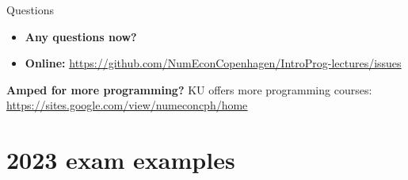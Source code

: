 \documentclass[10pt,english,t,aspectratio=169]{beamer}
\begin{document}
\begin{frame}{Questions}
\begin{itemize}
\item \textbf{Any questions now?}
\item \textbf{Online: }\href{https://github.com/NumEconCopenhagen/IntroProg-lectures/issues}{https://github.com/NumEconCopenhagen/IntroProg-lectures/issues}
\end{itemize}

\vfill
\textbf{Amped for more programming?} KU offers more programming courses: \underline{\href{https://sites.google.com/view/numeconcph/home}{https://sites.google.com/view/numeconcph/home}}
\end{frame}
%


\section{2023 exam examples}
\end{document}
